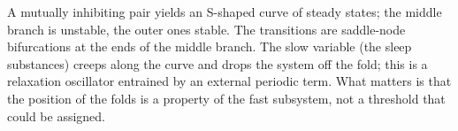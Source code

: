 \begin{ineq}
A mutually inhibiting pair yields an S-shaped curve of steady states; the middle branch is unstable, the outer ones stable. The transitions are saddle-node bifurcations at the ends of the middle branch. The slow variable (the sleep substances) creeps along the curve and drops the system off the fold; this is a relaxation oscillator entrained by an external periodic term. What matters is that the position of the folds is a property of the fast subsystem, not a threshold that could be assigned.
\end{ineq}
